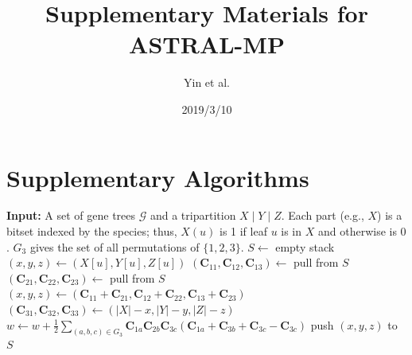\documentclass{article}
\begin{document}
\title{Supplementary Materials for ASTRAL-MP}
\author{Yin et al.}
\date{2019/3/10}
\maketitle

\section*{Supplementary Algorithms}

\begin{algorithm}
\caption{Weight calculation}
\label{alg:weight}
\begin{algorithmic}[1]
    \State \textbf{Input:} A set of gene trees $\mathcal{G}$ and a tripartition $X \mid Y \mid Z$. Each part (e.g., $X$) is a bitset indexed by the species; thus, $X(u)$ is 1 if leaf $u$ is in $X$ and otherwise is $0$. $G_3$ gives the set of all permutations of $\{1,2,3\}$.
        \State $S \leftarrow$ empty stack
                \State $(x, y, z) \leftarrow (X[u], Y[u], Z[u])$
            \Else
                \State $(\mathbf{C}_{11}, \mathbf{C}_{12}, \mathbf{C}_{13}) \leftarrow$ pull from $S$
                \State $(\mathbf{C}_{21}, \mathbf{C}_{22}, \mathbf{C}_{23}) \leftarrow$ pull from $S$
                \State $(x, y, z) \leftarrow (\mathbf{C}_{11} + \mathbf{C}_{21}, \mathbf{C}_{12} + \mathbf{C}_{22}, \mathbf{C}_{13} + \mathbf{C}_{23})$
                \State $(\mathbf{C}_{31}, \mathbf{C}_{32}, \mathbf{C}_{33}) \leftarrow (|X| - x, |Y| - y, |Z| - z)$
                \State $w \leftarrow w + \frac{1}{2} \sum_{(a, b, c) \in G_3} \mathbf{C}_{1a} \mathbf{C}_{2b} \mathbf{C}_{3c} (\mathbf{C}_{1a} + \mathbf{C}_{3b} + \mathbf{C}_{3c} - \mathbf{C}_{3c})$
            \EndIf
            \State push $(x, y, z)$ to $S$
        \EndFor
    \EndFor
\EndFunction
\end{algorithmic}
\end{algorithm}
\end{document}
